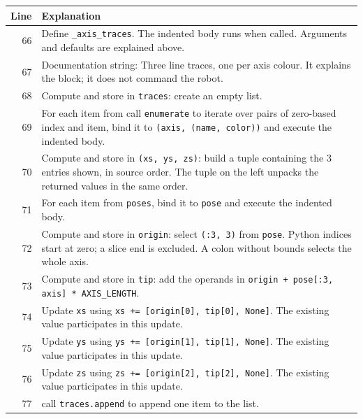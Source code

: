 \documentclass[11pt,a4paper]{book}
\begin{document}
\begin{longtable}{r p{}}

\textbf{Line} & \textbf{Explanation} \\ \hline \endhead

66 & Define \texttt{\_axis\_traces}. The indented body runs when called. Arguments and defaults are explained above. \\

67 & Documentation string: Three line traces, one per axis colour. It explains the block; it does not command the robot. \\

68 & Compute and store in \texttt{traces}: create an empty list.  \\

69 & For each item from call \texttt{enumerate} to iterate over pairs of zero-based index and item, bind it to \texttt{(axis, (name, color))} and execute the indented body. \\

70 & Compute and store in \texttt{(xs, ys, zs)}: build a tuple containing the 3 entries shown, in source order. The tuple on the left unpacks the returned values in the same order. \\

71 & For each item from \texttt{poses}, bind it to \texttt{pose} and execute the indented body. \\

72 & Compute and store in \texttt{origin}: select \texttt{(:3, 3)} from \texttt{pose}. Python indices start at zero; a slice end is excluded. A colon without bounds selects the whole axis.  \\

73 & Compute and store in \texttt{tip}: add the operands in \texttt{origin + pose[:3, axis] * AXIS\_LENGTH}.  \\

74 & Update \texttt{xs} using \texttt{xs += [origin[0], tip[0], None]}. The existing value participates in this update. \\

75 & Update \texttt{ys} using \texttt{ys += [origin[1], tip[1], None]}. The existing value participates in this update. \\

76 & Update \texttt{zs} using \texttt{zs += [origin[2], tip[2], None]}. The existing value participates in this update. \\

77 & call \texttt{traces.append} to append one item to the list. \\


\end{longtable}
\end{document}
